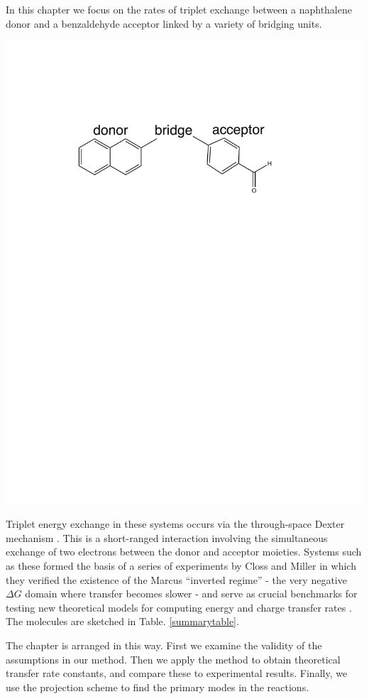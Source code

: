 In this chapter we focus on the rates of triplet exchange between a naphthalene donor and a benzaldehyde acceptor linked by a variety of bridging units.
\begin{center}
\includegraphics[width=0.50\columnwidth]{Chapters/chap2/Scheme1}
\end{center}
Triplet energy exchange in these systems occurs via the through-space Dexter mechanism \cite{dexter1953theory}.
This is a short-ranged interaction involving the simultaneous exchange of two electrons between the
donor and acceptor moieties.
Systems such as these formed the basis of a series of experiments by  Closs and Miller \cite{miller1984intramolecular}
in which they verified the existence of the Marcus ``inverted regime'' - the very negative $\Delta G$ domain where transfer becomes slower -
and serve as crucial benchmarks for testing new theoretical models for computing
energy and charge transfer rates \cite{subotnik2008constructing,subotnik2009initial,subotnik2010predicting}. The molecules are sketched in Table. \ref{summarytable}.

The chapter is arranged in this way. First we examine the validity of the assumptions in our method. Then we apply the method to obtain theoretical transfer rate constants, and compare these to experimental results. Finally, we use the projection scheme to find the primary modes in the reactions.


